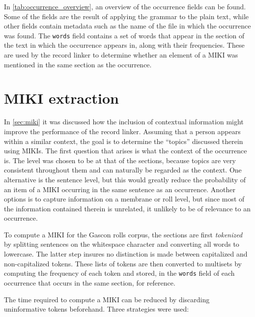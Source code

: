 In \cref{tab:occurrence_overview}, an overview of the occurrence fields can be found.
Some of the fields are the result of applying the grammar to the plain text, while other fields contain metadata such as the name of the file in which the occurrence was found.
The \texttt{words} field contains a set of words that appear in the section of the text in which the occurrence appears in, along with their frequencies.
These are used by the record linker to determine whether an element of a MIKI was mentioned in the same section as the occurrence.




\section{MIKI extraction}
\label{sec:miki_evaluation}

In \cref{sec:miki} it was discussed how the inclusion of contextual information might improve the performance of the record linker.
Assuming that a person appears within a similar context, the goal is to determine the ``topics'' discussed therein using MIKIs.
The first question that arises is what the context of the occurrence is.
The level was chosen to be at that of the sections, because topics are very consistent throughout them and can naturally be regarded as the context.
One alternative is the sentence level, but this would greatly reduce the probability of an item of a MIKI occurring in the same sentence as an occurrence.
Another options is to capture information on a membrane or roll level, but since most of the information contained therein is unrelated, it unlikely to be of relevance to an occurrence.

To compute a MIKI for the Gascon rolls corpus, the sections are first \emph{tokenized} by splitting sentences on the whitespace character and converting all words to lowercase.
The latter step insures no distinction is made between capitalized and non-capitalized tokens.
These lists of tokens are then converted to multisets by computing the frequency of each token and stored, in the \texttt{words} field of each occurrence that occurs in the same section, for reference.

The time required to compute a MIKI can be reduced by discarding uninformative tokens beforehand.
Three strategies were used:

